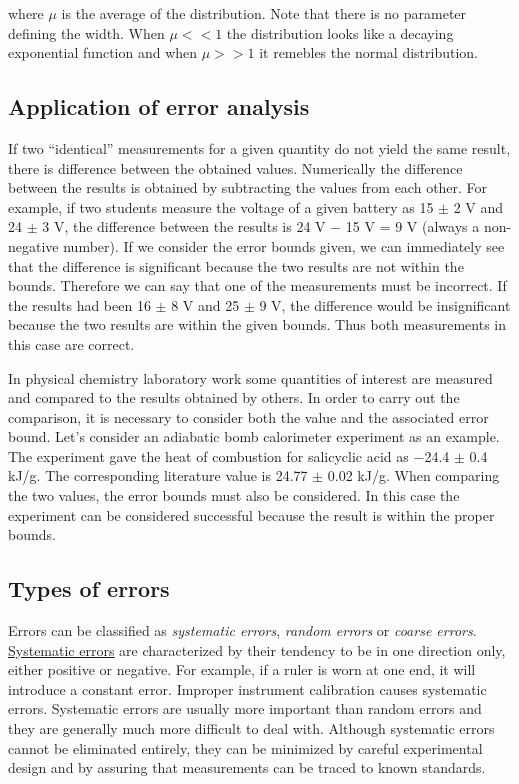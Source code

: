 \documentclass[byrevtex,amssymb,aps,pra,floatfix,letterpaper]{revtex4}
\begin{document}
\noindent
where $\mu$ is the average of the distribution. Note that there is no parameter defining the width. When $\mu<<1$ the distribution looks like a decaying exponential function and when $\mu>>1$ it remebles the normal distribution.

\subsection{Application of error analysis}

If two ``identical'' measurements for a given quantity do not yield the same result, there is
difference between the obtained values. Numerically the difference between the results is
obtained by subtracting the values from each other. For example, if two students measure the
voltage of a given battery as 15 $\pm$ 2 V and 24 $\pm$ 3 V, the difference between the results is 24 V $-$
15 V = 9 V (always a non-negative number). If we consider the error bounds given, we can
immediately see that the difference is significant because the two results are not within the
bounds. Therefore we can say that one of the measurements must be incorrect. If the results had
been 16 $\pm$ 8 V and 25 $\pm$ 9 V, the difference would be insignificant because the two results are
within the given bounds. Thus both measurements in this case are correct.

In physical chemistry laboratory work some quantities of interest are measured and
compared to the results obtained by others. In order to carry out the comparison, it is necessary to
consider both the value and the associated error bound. Let's consider an adiabatic bomb
calorimeter experiment as an example. The experiment gave the heat of combustion for salicyclic
acid as $-$24.4 $\pm$ 0.4 kJ/g. The corresponding literature value is 24.77 $\pm$ 0.02 kJ/g. When comparing
the two values, the error bounds must also be considered. In this case the experiment can be
considered successful because the result is within the proper bounds.

\subsection{Types of errors}

Errors can be classified as \textit{systematic errors}, \textit{random errors} or \textit{coarse errors}. \href{http://en.wikipedia.org/wiki/Systematic_error}{\underline{Systematic errors}} are characterized by their tendency to be in one direction only, either positive or negative. For example, if a ruler is worn at one end, it will introduce a constant error. Improper instrument calibration causes systematic errors. Systematic errors are usually more important than random errors and they are generally much more difficult to deal with. Although systematic errors cannot be eliminated entirely, they can be minimized by careful experimental design and by assuring that measurements can be traced to known standards.
\end{document}
